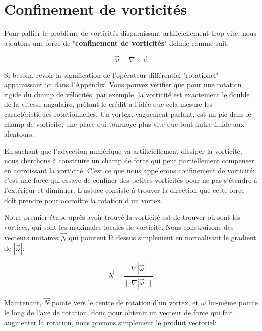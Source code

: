 \documentclass[11pt]{report}
\begin{document}
\section{Confinement de vorticités}   

Pour pallier le problème de vorticités disparaissant artificiellement trop vite, nous ajoutons une force de "\textbf{confinement de vorticités}" définie comme suit:

\begin{equation}
\overrightarrow{\omega} = \nabla \times \overrightarrow{u}
\end{equation}

Si besoin, revoir la signification de l'opérateur différentiel "rotationel" apparaissant ici dans l'Appendix. Vous pouvez vérifier que pour une rotation rigide du champ de vélocités, par exemple, la vorticité est exactement le double de la vitesse angulaire, prêtant le crédit à l'idée que cela mesure les caractéristiques rotationnelles. Un vortex, vaguement parlant, est un pic dans le champ de vorticité, une place qui tournoye plus vite que tout autre fluide aux alentours.\newline

En sachant que l'advection numérique va artificiellement dissiper la vorticité, nous cherchons à construire un champ de force qui peut partiellement compenser en accroissant la vorticité. C'est ce que nous appelerons confinement de vorticité: c'est une force qui essaye de confiner des petites vorticités pour ne pas s'étendre à l'extérieur et diminuer. L'astuce consiste à trouver la direction que cette force doit prendre pour accroitre la rotation d'un vortex.\newline

Notre premier étape après avoir trouvé la vorticité est de trouver où sont les vortices, qui sont les maximales locales de vorticité. Nous construisons des vecteurs unitaires $\overrightarrow{N}$ qui pointent là dessus simplement en normalisant le gradient de $ |\overrightarrow{\omega}|$:

\begin{equation}
\overrightarrow{N} = \frac{\nabla |\overrightarrow{\omega}|}{\| \nabla |\overrightarrow{\omega}| \|}
\end{equation}

Maintenant, $\overrightarrow{N}$ pointe vers le centre de rotation d'un vortex, et $\overrightarrow{\omega}$ lui-même pointe le long de l'axe de rotation, donc pour obtenir un vecteur de force qui fait augmenter la rotation, nous prenons simplement le produit vectoriel:
\end{document}
